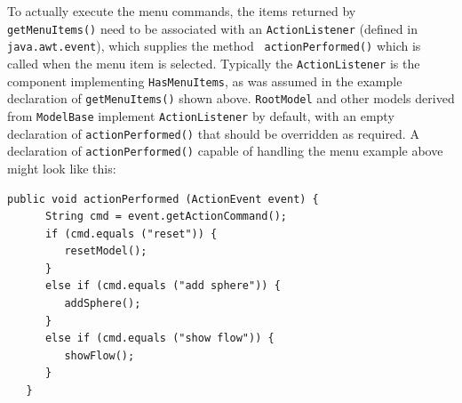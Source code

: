 To actually execute the menu commands, the items returned by {\tt
getMenuItems()} need to be associated with an {\tt ActionListener}
(defined in {\tt java.awt.event}), which supplies the method {\tt
actionPerformed()} which is called when the menu item is
selected. Typically the {\tt ActionListener} is the component
implementing {\tt HasMenuItems}, as was assumed in the example
declaration of {\tt getMenuItems()} shown above. {\tt RootModel} and
other models derived from {\tt ModelBase} implement {\tt ActionListener} by
default, with an empty declaration of {\tt actionPerformed()} that
should be overridden as required.
A declaration of {\tt actionPerformed()} capable of handling the menu
example above might look like this:
%
\begin{lstlisting}[]
   public void actionPerformed (ActionEvent event) {
      String cmd = event.getActionCommand();
      if (cmd.equals ("reset")) {
         resetModel();
      }
      else if (cmd.equals ("add sphere")) {
         addSphere();
      }
      else if (cmd.equals ("show flow")) {
         showFlow();
      }
   }
\end{lstlisting}
%

%
